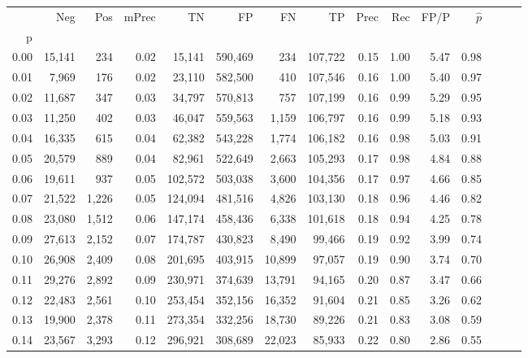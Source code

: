 \begin{tabular}{rrrrrrrrrrrrrrr}
\toprule
{} &     Neg &    Pos & mPrec &       TN &       FP &       FN &       TP &  Prec &   Rec &  FP/P & $\hat{p}$ \\
p    &         &        &       &          &          &          &          &       &       &       &           \\
\midrule
0.00 &  15,141 &    234 &  0.02 &   15,141 &  590,469 &      234 &  107,722 &  0.15 &  1.00 &  5.47 &      0.98 \\
0.01 &   7,969 &    176 &  0.02 &   23,110 &  582,500 &      410 &  107,546 &  0.16 &  1.00 &  5.40 &      0.97 \\
0.02 &  11,687 &    347 &  0.03 &   34,797 &  570,813 &      757 &  107,199 &  0.16 &  0.99 &  5.29 &      0.95 \\
0.03 &  11,250 &    402 &  0.03 &   46,047 &  559,563 &    1,159 &  106,797 &  0.16 &  0.99 &  5.18 &      0.93 \\
0.04 &  16,335 &    615 &  0.04 &   62,382 &  543,228 &    1,774 &  106,182 &  0.16 &  0.98 &  5.03 &      0.91 \\
0.05 &  20,579 &    889 &  0.04 &   82,961 &  522,649 &    2,663 &  105,293 &  0.17 &  0.98 &  4.84 &      0.88 \\
0.06 &  19,611 &    937 &  0.05 &  102,572 &  503,038 &    3,600 &  104,356 &  0.17 &  0.97 &  4.66 &      0.85 \\
0.07 &  21,522 &  1,226 &  0.05 &  124,094 &  481,516 &    4,826 &  103,130 &  0.18 &  0.96 &  4.46 &      0.82 \\
0.08 &  23,080 &  1,512 &  0.06 &  147,174 &  458,436 &    6,338 &  101,618 &  0.18 &  0.94 &  4.25 &      0.78 \\
0.09 &  27,613 &  2,152 &  0.07 &  174,787 &  430,823 &    8,490 &   99,466 &  0.19 &  0.92 &  3.99 &      0.74 \\
0.10 &  26,908 &  2,409 &  0.08 &  201,695 &  403,915 &   10,899 &   97,057 &  0.19 &  0.90 &  3.74 &      0.70 \\
0.11 &  29,276 &  2,892 &  0.09 &  230,971 &  374,639 &   13,791 &   94,165 &  0.20 &  0.87 &  3.47 &      0.66 \\
0.12 &  22,483 &  2,561 &  0.10 &  253,454 &  352,156 &   16,352 &   91,604 &  0.21 &  0.85 &  3.26 &      0.62 \\
0.13 &  19,900 &  2,378 &  0.11 &  273,354 &  332,256 &   18,730 &   89,226 &  0.21 &  0.83 &  3.08 &      0.59 \\
0.14 &  23,567 &  3,293 &  0.12 &  296,921 &  308,689 &   22,023 &   85,933 &  0.22 &  0.80 &  2.86 &      0.55 \\

\end{tabular}
